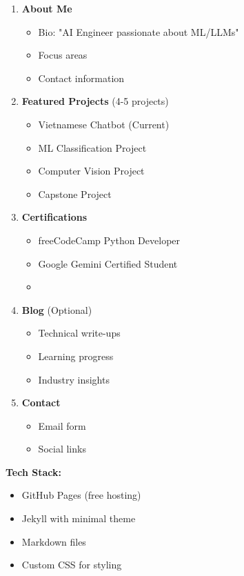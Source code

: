 \documentclass[12pt,a4paper]{article}
\begin{document}
\begin{enumerate}
    \item \textbf{About Me}
    \begin{itemize}
        \item Bio: "AI Engineer passionate about ML/LLMs"
        \item Focus areas
        \item Contact information
    \end{itemize}

    \item \textbf{Featured Projects} (4-5 projects)
    \begin{itemize}
        \item Vietnamese Chatbot (Current)
        \item ML Classification Project
        \item Computer Vision Project
        \item Capstone Project
    \end{itemize}

    \item \textbf{Certifications}
    \begin{itemize}
        \item freeCodeCamp Python Developer
        \item Google Gemini Certified Student
        \item [Others as completed]
    \end{itemize}

    \item \textbf{Blog} (Optional)
    \begin{itemize}
        \item Technical write-ups
        \item Learning progress
        \item Industry insights
    \end{itemize}

    \item \textbf{Contact}
    \begin{itemize}
        \item Email form
        \item Social links
    \end{itemize}
\end{enumerate}

\textbf{Tech Stack:}
\begin{itemize}
    \item GitHub Pages (free hosting)
    \item Jekyll with minimal theme
    \item Markdown files
    \item Custom CSS for styling
\end{itemize}
\end{document}
